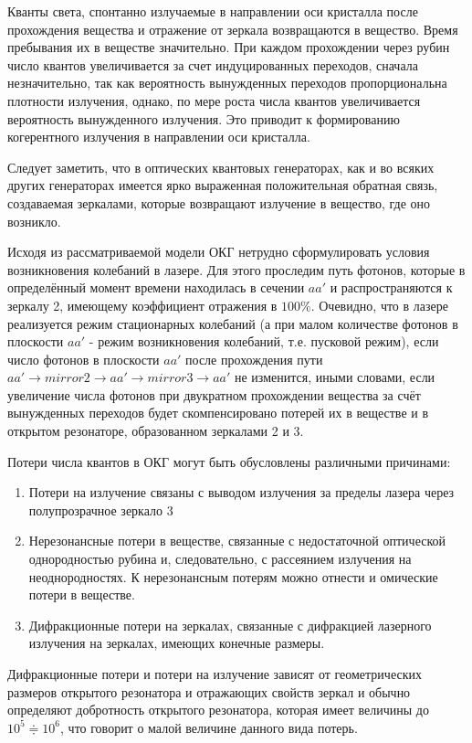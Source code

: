 \documentclass[a4paper,14pt,russian]{article}
\begin{document}
Кванты света, спонтанно излучаемые в направлении оси кристалла после прохождения вещества и отражение от зеркала возвращаются в вещество. Время пребывания их в веществе значительно. При каждом прохождении через рубин число квантов увеличивается за счет индуцированных переходов, сначала незначительно, так как вероятность вынужденных переходов пропорциональна плотности излучения, однако, по мере роста числа квантов увеличивается вероятность вынужденного излучения. Это приводит к формированию когерентного излучения в направлении оси кристалла.

Следует заметить, что в оптических квантовых генераторах, как и во всяких других генераторах имеется ярко выраженная положительная обратная связь, создаваемая зеркалами, которые возвращают излучение в вещество, где оно возникло.

Исходя из рассматриваемой модели ОКГ нетрудно сформулировать условия возникновения колебаний в лазере. Для этого проследим путь фотонов, которые в определённый момент времени находилась в сечении $a a'$ и распространяются к зеркалу 2, имеющему коэффициент отражения в $100\%$. Очевидно, что в лазере реализуется режим стационарных колебаний (а при малом количестве фотонов в плоскости $a a'$ - режим возникновения колебаний, т.е. пусковой режим), если число фотонов в плоскости $a a'$ после прохождения пути $a a' \to mirror 2 \to a a' \to mirror 3 \to a a'$ не изменится, иными словами, если увеличение числа фотонов при двукратном прохождении вещества за счёт вынужденных переходов будет скомпенсировано потерей их в веществе и в открытом резонаторе, образованном зеркалами 2 и 3.

Потери числа квантов в ОКГ могут быть обусловлены различными причинами:
\begin{enumerate}
\item Потери на излучение связаны с выводом излучения за пределы лазера через полупрозрачное зеркало 3
\item Нерезонансные потери в веществе, связанные с недостаточной оптической однородностью рубина и, следовательно, с рассеянием излучения на неоднородностях. К нерезонансным потерям можно отнести и омические потери в веществе.
\item Дифракционные потери на зеркалах, связанные с дифракцией лазерного излучения на зеркалах, имеющих конечные размеры.
\end{enumerate}

Дифракционные потери и потери на излучение зависят от геометрических размеров открытого резонатора и отражающих свойств зеркал и обычно определяют добротность открытого резонатора, которая имеет величины до $10^5 \Doteq 10^6$, что говорит о малой величине данного вида потерь.
\end{document}
